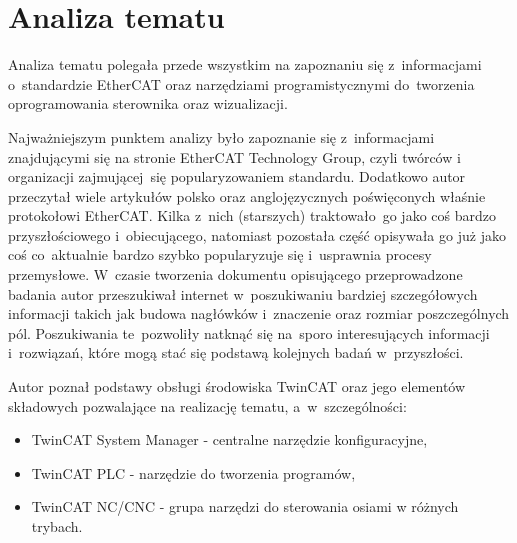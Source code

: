 \section{Analiza tematu}
Analiza tematu polegała przede wszystkim na zapoznaniu się z~informacjami o~standardzie EtherCAT oraz narzędziami programistycznymi do~tworzenia oprogramowania sterownika oraz wizualizacji.

Najważniejszym punktem analizy było zapoznanie się z~informacjami znajdującymi się na stronie EtherCAT Technology Group, czyli twórców i organizacji zajmującej~się popularyzowaniem standardu.
Dodatkowo autor przeczytał wiele artykułów polsko oraz anglojęzycznych poświęconych właśnie protokołowi EtherCAT. Kilka z~nich (starszych) traktowało~go jako coś bardzo przyszłościowego i~obiecującego, natomiast pozostała część opisywała go już jako coś co~aktualnie bardzo szybko popularyzuje się i~usprawnia procesy przemysłowe.
W~czasie tworzenia dokumentu opisującego przeprowadzone badania autor przeszukiwał internet w~poszukiwaniu bardziej szczegółowych informacji takich jak budowa nagłówków i~znaczenie oraz rozmiar poszczególnych pól. Poszukiwania te~pozwoliły natknąć się na~sporo interesujących informacji i~rozwiązań, które mogą stać się podstawą kolejnych badań w~przyszłości.

Autor poznał podstawy obsługi środowiska TwinCAT oraz jego elementów składowych pozwalające na realizację tematu, a~w~szczególności:
\begin{itemize}
\item TwinCAT System Manager - centralne narzędzie konfiguracyjne,
\item TwinCAT PLC - narzędzie do tworzenia programów,
\item TwinCAT NC/CNC - grupa narzędzi do sterowania osiami w różnych trybach.
\end{itemize} 



